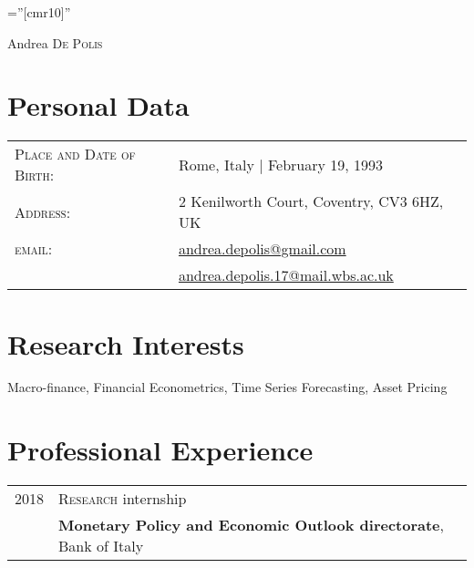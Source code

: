 \documentclass[a4paper,12pt]{article}
\begin{document}
\font\fb=''[cmr10]''

\par{\centering
		{\Huge Andrea \textsc{De Polis}
	}\par}

\section{Personal Data}
\renewcommand{\arraystretch}{0.5}
\begin{tabular}{ll}
    \textsc{Place and Date of Birth:} & Rome, Italy  | February 19, 1993 \\
    \textsc{Address:}   & 2 Kenilworth Court, Coventry, CV3 6HZ, UK \\
    \textsc{email:}     & \href{mailto:andrea.depolis@gmail.com}{andrea.depolis@gmail.com}\\
                        & \href{mailto:andrea.depolis.17@mail.wbs.ac.uk}{andrea.depolis.17@mail.wbs.ac.uk}
\end{tabular}
\section{Research Interests}
Macro-finance, Financial Econometrics, Time Series Forecasting, Asset Pricing
\section{Professional Experience}
\begin{tabular}{ll}
2018 & \textsc{Research} internship \\
&\textbf{Monetary Policy and Economic Outlook directorate}, Bank of Italy
\end{tabular}
\end{document}
